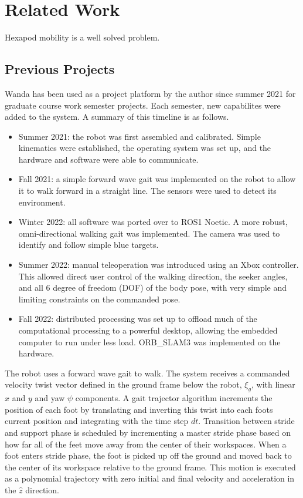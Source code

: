 \section{Related Work}

Hexapod mobility is a well solved problem. 

\subsection{ Previous Projects }

Wanda has been used as a project platform by the author since summer 2021 for graduate course work semester projects. Each semester, new capabilites were added to the system. A summary of this timeline is as follows.

\begin{itemize}
    \item Summer 2021: the robot was first assembled and calibrated. Simple kinematics were established, the operating system was set up, and the hardware and software were able to communicate.
    \item Fall 2021: a simple forward wave gait was implemented on the robot to allow it to walk forward in a straight line. The sensors were used to detect its environment. 
    \item Winter 2022: all software was ported over to ROS1 Noetic. A more robust, omni-directional walking gait was implemented. The camera was used to identify and follow simple blue targets.
    \item Summer 2022: manual teleoperation was introduced using an Xbox controller. This allowed direct user control of the walking direction, the seeker angles, and all 6 degree of freedom (DOF) of the body pose, with very simple and limiting constraints on the commanded pose.
    \item Fall 2022: distributed processing was set up to offload much of the computational processing to a powerful desktop, allowing the embedded computer to run under less load. ORB\_SLAM3 \cite{orbslam} was implemented on the hardware.
\end{itemize}

The robot uses a forward wave gait to walk. The system receives a commanded velocity twist vector defined in the ground frame below the robot, $\xi_g$, with linear $x$ and $y$ and yaw $\psi$ components. A gait trajector algorithm increments the position of each foot by translating and inverting this twist into each foots current position and integrating with the time step $dt$. Transition between stride and support phase is scheduled by incrementing a master stride phase based on how far all of the feet move away from the center of their workspaces. When a foot enters stride phase, the foot is picked up off the ground and moved back to the center of its workspace relative to the ground frame. This motion is executed as a polynomial trajectory with zero initial and final velocity and acceleration in the $\hat{z}$ direction. 

